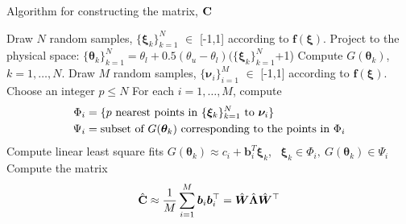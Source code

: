 \bigskip
\begin{breakablealgorithm}
  \caption{Algorithm for constructing the matrix, $\mathbf{{C}}$}
  \begin{algorithmic}[1]
	\State Draw $N$ random samples, $\{\bm{\xi}_k\}_{k=1}^{N}$ $\in$ [-1,1]
	according to $\bm{f(\xi)}$.
	\State Project to the physical space:
	$\{\bm{\theta}_k\}_{k=1}^{N}=\theta_l+0.5(\theta_u-\theta_l)(\{\bm{\xi}_k\}_{k=1}^{N}$+1)
	\State Compute $G(\bm\theta_k)$, $k=1, \ldots, N$.
	\State Draw $M$ random samples, $\{\bm{\nu}_i\}_{i=1}^{M}$ $\in$ [-1,1]
	according to $\bm{f(\xi)}$.
	\State Choose an integer $p \leq N$ 
	\State For each $i=1, \ldots, M$, compute 
	\[
	\begin{aligned}
	\Phi_i &= \{ p \text{ nearest points in } \{\bm{\xi}_k\}_{k=1}^{N} \text{ to } \bm{\nu}_i\}\\
	\vspace{-2mm}
	\Psi_i &= \text{subset of } G(\bm\theta_k) \text{ corresponding to the points in } \Phi_i
	\end{aligned}
	\]
	\State Compute linear least square fits 
	 $G(\bm\theta_k) \approx c_i + \bm{b}_i^T\bm{\xi}_k$, \  $\bm{\xi}_k \in \Phi_i, \ G(\bm\theta_k) \in \Psi_i$
	\State Compute the matrix 
	\[
	\hat{\mathbf{{C}}} \approx \frac{1}{M} \sum_{i=1}^{M} \bm{b}_i \bm{b}_i^\top = 
	{\hat{\bm{W}}}{\hat{\bm{\Lambda}}}{\hat{\bm{W}}}^\top
	\]
	\EndProcedure
  \end{algorithmic}
  \label{alg:free2}
\end{breakablealgorithm}
\bigskip




